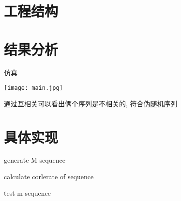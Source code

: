 \documentclass{zjureport}
\begin{document}
\section{工程结构}
    

\section{结果分析}
    \begin{clause}
	\item 仿真
      \begin{center}
        \texttt{[image: main.jpg]}
      \end{center}
	 \item 通过互相关可以看出俩个序列是不相关的, 符合伪随机序列
    \end{clause}
  	

\section{具体实现}
    \begin{clause}
	\item generate M sequence
	  
	 \item calculate corlerate of sequence
	  
	 \item test m sequence
	  
    \end{clause}
\end{document}
